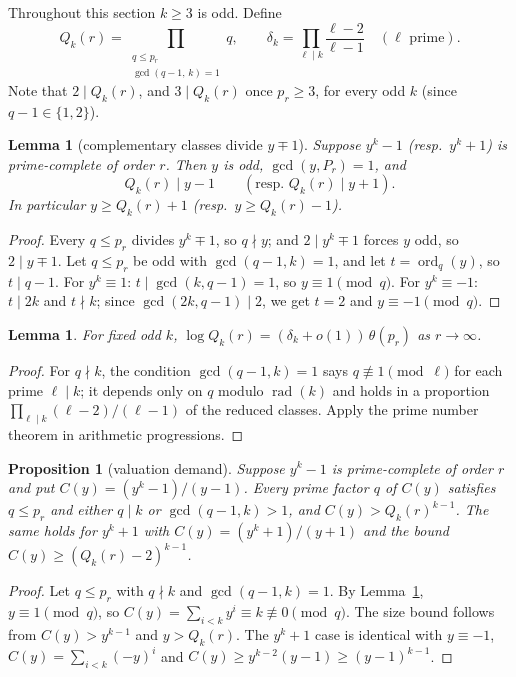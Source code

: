 \documentclass[11pt]{article}
\newtheorem{lemma}[theorem]{Lemma}
\newtheorem{proposition}[theorem]{Proposition}
\theoremstyle{definition}
\theoremstyle{remark}
\newcommand{\rad}{\operatorname{rad}}
\newcommand{\ord}{\operatorname{ord}}
\begin{document}
Throughout this section $k\ge3$ is odd. Define
\[
Q_k(r)=\prod_{\substack{q\le p_r\\ \gcd(q-1,\,k)=1}}q,\qquad
\delta_k=\prod_{\ell\mid k}\frac{\ell-2}{\ell-1}\quad(\ell\text{ prime}).
\]
Note that $2\mid Q_k(r)$, and $3\mid Q_k(r)$ once $p_r\ge3$, for every odd $k$ (since $q-1\in\{1,2\}$).

\begin{lemma}[complementary classes divide $y\mp1$]\label{lem:Q}
Suppose $y^k-1$ (resp.\ $y^k+1$) is prime-complete of order $r$. Then $y$ is
odd, $\gcd(y,P_r)=1$, and
\[
Q_k(r)\mid y-1\qquad(\text{resp. } Q_k(r)\mid y+1).
\]
In particular $y\ge Q_k(r)+1$ (resp.\ $y\ge Q_k(r)-1$).
\end{lemma}
\begin{proof}
Every $q\le p_r$ divides $y^k\mp1$, so $q\nmid y$; and $2\mid y^k\mp1$ forces
$y$ odd, so $2\mid y\mp1$. Let $q\le p_r$ be odd with $\gcd(q-1,k)=1$, and let
$t=\ord_q(y)$, so $t\mid q-1$.
For $y^k\equiv1$: $t\mid\gcd(k,q-1)=1$, so $y\equiv1\pmod q$.
For $y^k\equiv-1$: $t\mid 2k$ and $t\nmid k$; since $\gcd(2k,q-1)\mid2$, we get
$t=2$ and $y\equiv-1\pmod q$.
\end{proof}

\begin{lemma}\label{lem:density}
For fixed odd $k$, $\log Q_k(r)=(\delta_k+o(1))\,\theta(p_r)$ as $r\to\infty$.
\end{lemma}
\begin{proof}
For $q\nmid k$, the condition $\gcd(q-1,k)=1$ says $q\not\equiv1\pmod\ell$ for
each prime $\ell\mid k$; it depends only on $q$ modulo $\rad(k)$ and holds in
a proportion $\prod_{\ell\mid k}(\ell-2)/(\ell-1)$ of the reduced classes. Apply
the prime number theorem in arithmetic progressions.
\end{proof}

\begin{proposition}[valuation demand]\label{prop:demand}
Suppose $y^k-1$ is prime-complete of order $r$ and put
$C(y)=(y^k-1)/(y-1)$. Every prime factor $q$ of $C(y)$ satisfies $q\le p_r$ and
either $q\mid k$ or $\gcd(q-1,k)>1$, and $C(y)>Q_k(r)^{k-1}$. The same holds for
$y^k+1$ with $C(y)=(y^k+1)/(y+1)$ and the bound $C(y)\ge(Q_k(r)-2)^{k-1}$.
\end{proposition}
\begin{proof}
Let $q\le p_r$ with $q\nmid k$ and $\gcd(q-1,k)=1$. By Lemma~\ref{lem:Q},
$y\equiv1\pmod q$, so $C(y)=\sum_{i<k}y^i\equiv k\not\equiv0\pmod q$. The size
bound follows from $C(y)>y^{k-1}$ and $y>Q_k(r)$. The $y^k+1$ case is identical
with $y\equiv-1$, $C(y)=\sum_{i<k}(-y)^i$ and
$C(y)\ge y^{k-2}(y-1)\ge(y-1)^{k-1}$.
\end{proof}
\end{document}

